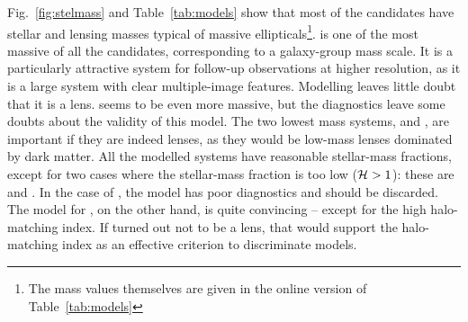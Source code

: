 Fig.~\ref{fig:stelmass} and Table~\ref{tab:models} show that most of the
candidates have stellar
and lensing masses typical of massive ellipticals\footnote{The mass values
themselves are given in the online version of Table~\ref{tab:models}}.
 is one of the most massive of all the candidates, corresponding
to a galaxy-group mass scale.  It is a particularly attractive system
for follow-up observations at higher resolution, as it is a large
system with clear multiple-image features. Modelling leaves little
doubt that it is a lens.   seems to be even more massive, but the
diagnostics leave some doubts about the validity of this model.  The
two lowest mass systems,  and , are important if they are
indeed lenses, as they would be low-mass lenses dominated by dark
matter.  All the modelled systems have reasonable stellar-mass
fractions, except for two cases where the stellar-mass fraction is too
low ($\mathcal{H} > 1$): these are  and .  In the case of ,
the model has poor diagnostics and should be discarded.  The model
for , on the other hand, is quite convincing -- except for the
high halo-matching index.  If  turned out not to be a lens, that
would support the halo-matching index as an effective criterion to
discriminate models.

